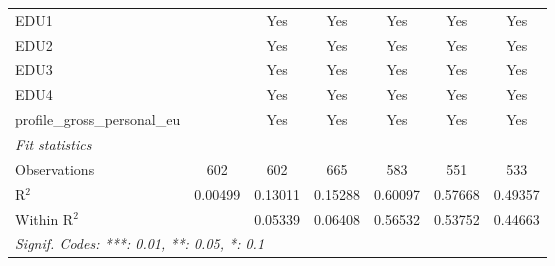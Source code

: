 \begin{tabular}{lcccccc}
   EDU1                                      &          & Yes           & Yes           & Yes           & Yes          & Yes\\  
   EDU2                                      &          & Yes           & Yes           & Yes           & Yes          & Yes\\  
   EDU3                                      &          & Yes           & Yes           & Yes           & Yes          & Yes\\  
   EDU4                                      &          & Yes           & Yes           & Yes           & Yes          & Yes\\  
   profile\_gross\_personal\_eu              &          & Yes           & Yes           & Yes           & Yes          & Yes\\  
   \midrule
   \emph{Fit statistics}\\
   Observations                              & 602      & 602           & 665           & 583           & 551          & 533\\  
   R$^2$                                     & 0.00499  & 0.13011       & 0.15288       & 0.60097       & 0.57668      & 0.49357\\  
   Within R$^2$                              &          & 0.05339       & 0.06408       & 0.56532       & 0.53752      & 0.44663\\  
   \midrule \midrule
   \multicolumn{7}{l}{\emph{Signif. Codes: ***: 0.01, **: 0.05, *: 0.1}}\\
\end{tabular}
\par\endgroup




